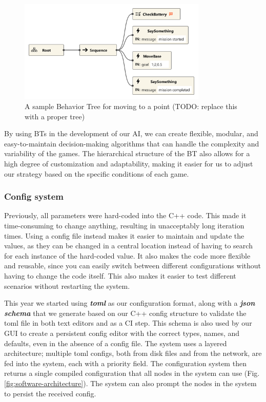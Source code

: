 \documentclass[runningheads]{llncs}
\begin{document}
\begin{figure}
	\centering
	\includegraphics[width=0.8\textwidth]{images/bt-move.png}
	\caption{A sample Behavior Tree for moving to a point (TODO: replace this with a proper tree)}
	\label{fig:bt-move}
\end{figure}

By using BTs in the development of our AI, we can create flexible, modular, and easy-to-maintain decision-making algorithms that can handle the complexity and variability of the games. The hierarchical structure of the BT also allows for a high degree of customization and adaptability, making it easier for us to adjust our strategy based on the specific conditions of each game.

\subsubsection{Config system}
Previously, all parameters were hard-coded into the C++ code. This made it time-consuming to change anything, resulting in unacceptably long iteration times. Using a config file instead makes it easier to maintain and update the values, as they can be changed in a central location instead of having to search for each instance of the hard-coded value. It also makes the code more flexible and reusable, since you can easily switch between different configurations without having to change the code itself. This also makes it easier to test different scenarios without restarting the system.

This year we started using \textbf{\textit{toml}} \cite{ref_toml} as our configuration format, along with a \textbf{\textit{json schema}} \cite{ref_json-schema} that we generate based on our C++ config structure to validate the toml file in both text editors and as a CI step. This schema is also used by our GUI to create a persistent config editor with the correct types, names, and defaults, even in the absence of a config file. The system uses a layered architecture; multiple toml configs, both from disk files and from the network, are fed into the system, each with a priority field. The configuration system then returns a single compiled configuration that all nodes in the system can use (Fig. \ref{fig:software-architecture}). The system can also prompt the nodes in the system to persist the received config.
\end{document}
